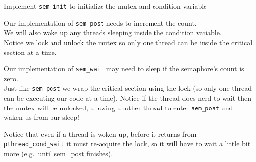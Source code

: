 Implement \texttt{sem\_init} to initialize the mutex and condition
variable

\begin{Shaded}
\begin{Highlighting}[]
   
   \NormalTok{; } \NormalTok{-}\NormalTok{;\}}

   \NormalTok{;}
\NormalTok{\}}
\end{Highlighting}
\end{Shaded}

Our implementation of \texttt{sem\_post} needs to increment the
count.\\We will also wake up any threads sleeping inside the condition
variable.\\Notice we lock and unlock the mutex so only one thread can be
inside the critical section at a time.

\begin{Shaded}
\begin{Highlighting}[]

\NormalTok{\}}
\end{Highlighting}
\end{Shaded}

Our implementation of \texttt{sem\_wait} may need to sleep if the
semaphore's count is zero.\\Just like \texttt{sem\_post} we wrap the
critical section using the lock (so only one thread can be executing our
code at a time). Notice if the thread does need to wait then the mutex
will be unlocked, allowing another thread to enter \texttt{sem\_post}
and waken us from our sleep!

Notice that even if a thread is woken up, before it returns from
\texttt{pthread\_cond\_wait} it must re-acquire the lock, so it will
have to wait a little bit more (e.g.~until sem\_post finishes).

